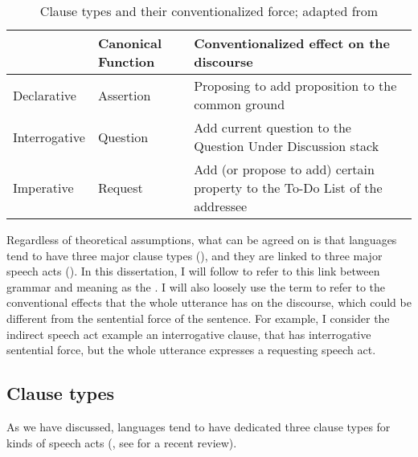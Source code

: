 \begin{table}[H]
\begin{center}
\begin{tabular}{l|l|p{8cm}} 
\hline 
& Canonical Function & Conventionalized effect on the discourse \\
\hline
Declarative & Assertion & Proposing to add proposition to the common ground \\ 
\hline
Interrogative & Question & Add current question to the Question Under Discussion stack \\
\hline
Imperative & Request & Add (or propose to add) certain property to the To-Do List of the addressee \\ 
\hline
\end{tabular} 
\end{center}
\caption{Clause types and their conventionalized force; adapted from \textcite[p.238]{portner2004}}
\label{tab:intro:portner2004}
\end{table}



Regardless of theoretical assumptions, what can be agreed on is that languages tend to have three major clause types (\diis{}), and they are linked to three major speech acts (\aqrs{}). In this dissertation, I will follow \textcite{chierchia1990textbook} to refer to this link between grammar and meaning as the . I will also loosely use the term  to refer to the conventional effects that the whole utterance has on the discourse, which could be different from the sentential force of the sentence. For example, I consider the indirect speech act example  an interrogative clause, that has interrogative sentential force, but the whole utterance expresses a requesting speech act. 




\subsection{Clause types}
\label{sec:bg:theory:clause}

As we have discussed, languages tend to have dedicated three clause types for kinds of speech acts (\citealt{sz1985speechact, konig2007, aikhenvald2016, portner2018}, see \cite{konig2020} for a recent review).

